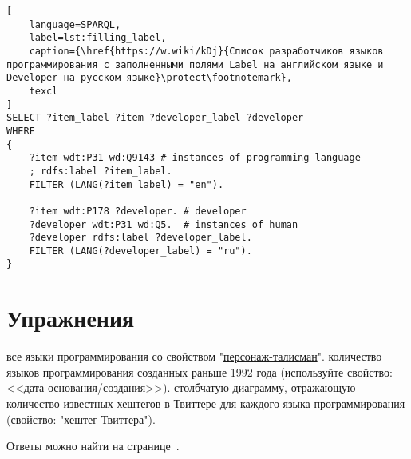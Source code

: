 \begin{lstlisting}[
	language=SPARQL,
	label=lst:filling_label,
	caption={\href{https://w.wiki/kDj}{Список разработчиков языков программирования с заполненными полями Label на английском языке и Developer на русском языке}\protect\footnotemark},
	texcl
]
SELECT ?item_label ?item ?developer_label ?developer
WHERE
{
    ?item wdt:P31 wd:Q9143 # instances of programming language
    ; rdfs:label ?item_label. 
    FILTER (LANG(?item_label) = "en"). 

    ?item wdt:P178 ?developer. # developer 
    ?developer wdt:P31 wd:Q5.  # instances of human
    ?developer rdfs:label ?developer_label. 
    FILTER (LANG(?developer_label) = "ru").  
}
\end{lstlisting}

\section{Упражнения}
\label{prog_lang_test}
\begin{enumerate}
	 все языки программирования со свойством "\href{https://www.wikidata.org/wiki/Property:P822}{персонаж-талисман}".
	 количество языков программирования созданных раньше 1992 года (используйте свойство: <<\href{https://www.wikidata.org/wiki/Property:P571}{дата-основания/создания}>>).
	 столбчатую диаграмму, отражающую количество известных хештегов в Твиттере для каждого языка программирования (свойство: "\href{https://www.wikidata.org/wiki/Property:P2572}{хештег Твиттера}").
\end{enumerate}

Ответы можно найти на странице~\pageref{answer:prog_langs_4}.